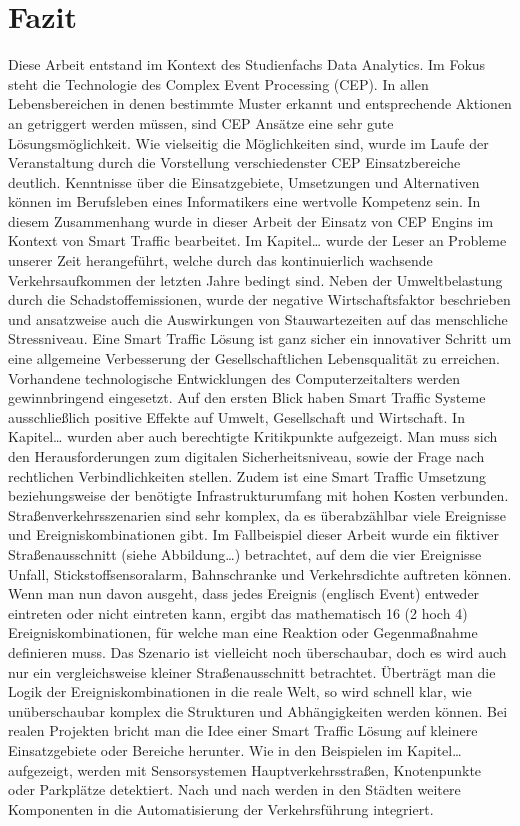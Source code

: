 \section{Fazit}

Diese Arbeit entstand im Kontext des Studienfachs Data Analytics. Im Fokus steht die Technologie des Complex Event Processing (CEP). In allen Lebensbereichen in denen bestimmte Muster erkannt und entsprechende Aktionen an getriggert werden müssen, sind CEP Ansätze eine sehr gute Lösungsmöglichkeit. Wie vielseitig die Möglichkeiten sind, wurde im Laufe der Veranstaltung durch die Vorstellung verschiedenster CEP Einsatzbereiche deutlich. Kenntnisse über die Einsatzgebiete, Umsetzungen und Alternativen können im Berufsleben eines Informatikers eine wertvolle Kompetenz sein. In diesem Zusammenhang wurde in dieser Arbeit der Einsatz von CEP Engins im Kontext von Smart Traffic bearbeitet.
Im Kapitel… wurde der Leser an Probleme unserer Zeit herangeführt, welche durch das kontinuierlich wachsende Verkehrsaufkommen der letzten Jahre bedingt sind. Neben der Umweltbelastung durch die Schadstoffemissionen, wurde der negative Wirtschaftsfaktor beschrieben und ansatzweise auch die Auswirkungen von Stauwartezeiten auf das menschliche Stressniveau. Eine Smart Traffic Lösung ist ganz sicher ein innovativer Schritt um eine allgemeine Verbesserung der Gesellschaftlichen Lebensqualität zu erreichen. Vorhandene technologische Entwicklungen des Computerzeitalters werden gewinnbringend eingesetzt. Auf den ersten Blick haben Smart Traffic Systeme ausschließlich positive Effekte auf Umwelt, Gesellschaft und Wirtschaft. In Kapitel… wurden aber auch berechtigte Kritikpunkte aufgezeigt. Man muss sich den Herausforderungen zum digitalen Sicherheitsniveau, sowie der Frage nach rechtlichen Verbindlichkeiten stellen. Zudem ist eine Smart Traffic Umsetzung beziehungsweise der benötigte Infrastrukturumfang mit hohen Kosten verbunden. Straßenverkehrsszenarien sind sehr komplex, da es überabzählbar  viele Ereignisse und Ereigniskombinationen gibt. Im Fallbeispiel dieser Arbeit wurde ein fiktiver Straßenausschnitt (siehe Abbildung…) betrachtet, auf dem die vier Ereignisse Unfall, Stickstoffsensoralarm, Bahnschranke und Verkehrsdichte auftreten können. Wenn man nun davon ausgeht, dass jedes Ereignis (englisch Event) entweder eintreten oder nicht eintreten kann, ergibt das mathematisch 16 (2 hoch 4) Ereigniskombinationen, für welche man eine Reaktion oder Gegenmaßnahme definieren muss. Das Szenario ist vielleicht noch überschaubar, doch es wird auch nur ein vergleichsweise kleiner Straßenausschnitt betrachtet. Überträgt man die Logik der Ereigniskombinationen in die reale Welt, so wird schnell klar, wie unüberschaubar komplex die Strukturen und Abhängigkeiten werden können. Bei realen Projekten bricht man die Idee einer Smart Traffic Lösung auf kleinere Einsatzgebiete oder Bereiche herunter. Wie in den Beispielen im Kapitel… aufgezeigt, werden mit Sensorsystemen Hauptverkehrsstraßen, Knotenpunkte oder Parkplätze detektiert. Nach und nach werden in den Städten weitere Komponenten in die Automatisierung der Verkehrsführung integriert.
